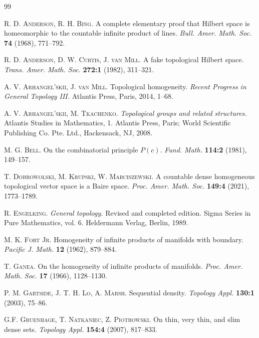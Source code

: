 \documentclass{amsart}
\theoremstyle{plain}
\theoremstyle{definition}
\begin{document}
\begin{thebibliography}{99}

\textsc{R. D. Anderson, R. H. Bing.} A complete elementary proof that Hilbert space is homeomorphic to the countable infinite product of lines. \textit{Bull. Amer. Math. Soc.} \textbf{74} (1968), 771--792.

\textsc{R. D. Anderson, D. W. Curtis, J. van Mill.} A fake topological Hilbert space. \textit{Trans. Amer. Math. Soc.} \textbf{272:1} (1982), 311--321.

\textsc{A. V. Arhangel'skii, J. van Mill.} Topological homogeneity. \textit{Recent Progress in General Topology III.} Atlantis Press, Paris, 2014, 1--68.

\textsc{A. V. Arhangel'skii, M. Tkachenko.} \textit{Topological groups and related structures.} Atlantis Studies in Mathematics, 1. Atlantis Press, Paris; World Scientific Publishing Co. Pte. Ltd., Hackensack, NJ, 2008.

\textsc{M. G. Bell.} On the combinatorial principle $P(c)$. \emph{Fund. Math.} \textbf{114:2} (1981), 149--157.

\textsc{T. Dobrowolski, M. Krupski, W. Marciszewski.} A countable dense homogeneous topological vector space is a Baire space. \textit{Proc. Amer. Math. Soc.} \textbf{149:4} (2021), 1773--1789.

\textsc{R. Engelking.} \textit{General topology.} Revised and completed edition. Sigma Series in Pure Mathematics, vol. 6. Heldermann Verlag, Berlin, 1989.

\textsc{M. K. Fort Jr.} Homogeneity of infinite products of manifolds with boundary. \textit{Pacific J. Math.} \textbf{12} (1962), 879--884.

\textsc{T. Ganea.} On the homogeneity of infinite products of manifolds. \textit{Proc. Amer. Math. Soc.} \textbf{17} (1966), 1128--1130.

\textsc{P. M. Gartside, J. T. H. Lo, A. Marsh.} Sequential density. \textit{Topology Appl.} \textbf{130:1} (2003), 75--86.

\textsc{G.F. Gruenhage, T. Natkaniec, Z. Piotrowski.} On thin, very thin, and slim dense sets. \textit{Topology Appl.} \textbf{154:4} (2007), 817--833.


\end{thebibliography}
\end{document}
